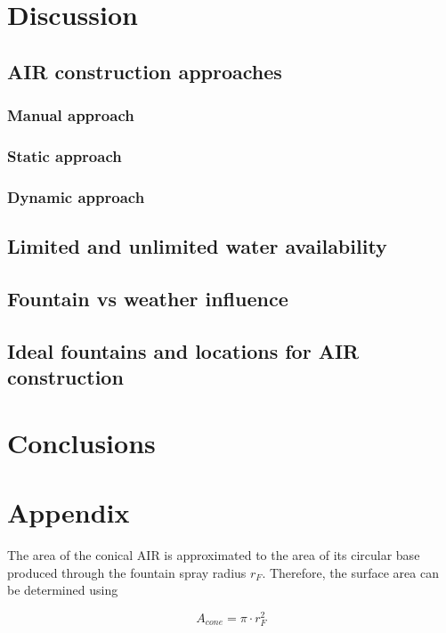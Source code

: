 \documentclass[utf8]{frontiersSCNS}
\begin{document}
\section{Discussion}
\subsection{AIR construction approaches}
\subsubsection{Manual approach}
\subsubsection{Static approach}
\subsubsection{Dynamic approach}

\subsection{Limited and unlimited water availability}

\subsection{Fountain vs weather influence}

\subsection{Ideal fountains and locations for AIR construction}

\section{Conclusions}


\section{Appendix}

The area of the conical AIR is approximated to the area of its circular base produced through the fountain spray
radius $r_F$. Therefore, the surface area can be determined using

\begin{equation} A_{cone} =\pi \cdot r_{F}^2 \label{eq:Area} \end{equation}
\end{document}

